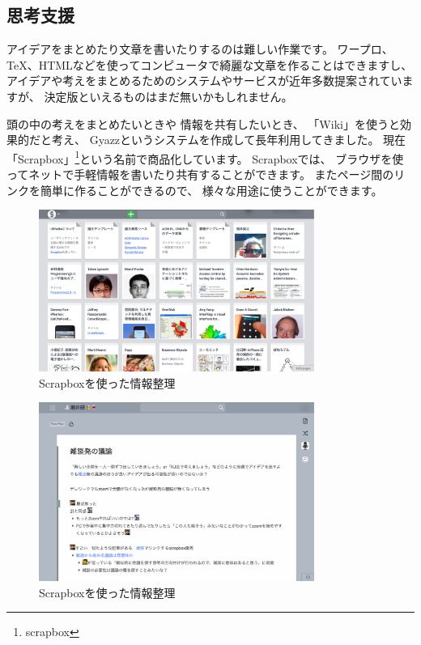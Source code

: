 \documentclass[topics]{compsoft} %
\begin{document}
\subsection{思考支援}

アイデアをまとめたり文章を書いたりするのは難しい作業です。
ワープロ、{\TeX}、HTMLなどを使ってコンピュータで綺麗な文章を作ることはできますし、
アイデアや考えをまとめるためのシステムやサービスが近年多数提案されていますが、
決定版といえるものはまだ無いかもしれません。

頭の中の考えをまとめたいときや
情報を共有したいとき、
「Wiki」を使うと効果的だと考え、
Gyazz\cite{Gyazz}というシステムを作成して長年利用してきました。
現在「Scrapbox」\footnote{scrapbox}という名前で商品化しています。
Scrapboxでは、
ブラウザを使ってネットで手軽情報を書いたり共有することができます。
またページ間のリンクを簡単に作ることができるので、
様々な用途に使うことができます。

\begin{figure}[t]
  \includegraphics[width=9cm,bb=0 0 2607 1535]{figures/13982c755fdc0c60af2548c0a6589543.png}
  \caption{Scrapboxを使った情報整理}
  \label{example1}
\end{figure}

\begin{figure}[t]
  \includegraphics[width=9cm,bb=0 0 2235 1452]{figures/cca2e0eaed298ea4952a26d2effa238c.png}
  \caption{Scrapboxを使った情報整理}
  \label{example1}
\end{figure}
\end{document}
